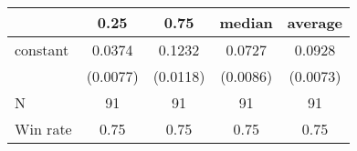 \begin{tabular}{lcccc}
\hline
         &   0.25   &   0.75   &  median  & average   \\
\midrule
\midrule
constant & 0.0374   & 0.1232   & 0.0727   & 0.0928    \\
         & (0.0077) & (0.0118) & (0.0086) & (0.0073)  \\
N        & 91       & 91       & 91       & 91        \\
Win rate & 0.75     & 0.75     & 0.75     & 0.75      \\
\hline
\end{tabular}
